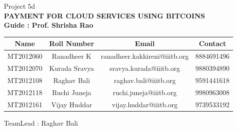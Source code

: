 \documentclass[a4page,12pt]{article}
\begin{document}
\begin{titlepage}

\begin{center}

\textup{\large Project 5d}\\[1.0cm]

\uppercase{\Large \textbf {Payment for Cloud Services Using BitCoins}}\\[3.0cm]

\normalsize \textbf{Guide : Prof. Shrisha Rao}\\
\begin{table}[h]
\centering
\begin{tabular}{|c|c|c|c|}
\hline 
Name  & Roll Number  & Email  & Contact \tabularnewline
\hline 
MT2012060  & Ranadheer K  &  ranadheer.kakkireni@iiitb.org  & 8884691496 \tabularnewline
\hline 
MT2012070  & Kurada Sravya  & sravya.kurada@iiitb.org  & 9880394890 \tabularnewline
\hline 
MT2012108  & Raghav Bali  & raghav.bali@iiitb.org  & 9591441618 \tabularnewline
\hline 
MT2012118  & Ruchi Juneja  & ruchi.juneja@iiitb.org  & 9980963008 \tabularnewline
\hline 
MT2012161  & Vijay Huddar  & vijay.huddar@iiitb.org  & 9739533192 \tabularnewline
\hline 
\end{tabular}
\end{table}
TeamLead : Raghav Bali
\vfill

\normalsize
\end{center}

\end{titlepage}
\pagebreak
\setcounter{tocdepth}{4}
\setcounter{secnumdepth}{4}
\tableofcontents
{}
\pagebreak
\end{document}
